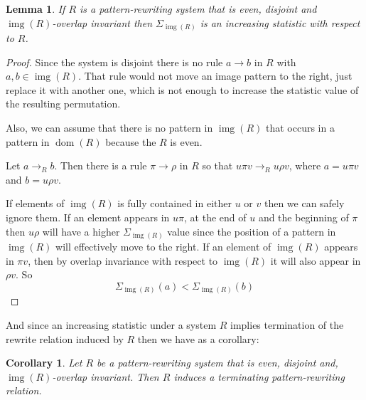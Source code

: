 \documentclass[a4paper, 11pt, english]{article}
\newcommand{\patternrule}{ \to \!}
\newtheorem{lemma}[theorem]{Lemma}
\newtheorem{corollary}[theorem]{Corollary}
\theoremstyle{definition}
\DeclareMathOperator{\dom}{dom}
\DeclareMathOperator{\img}{img}
\begin{document}
\begin{lemma}
  If $R$ is a pattern-rewriting system that is even, disjoint and $\img(R)$-overlap invariant 
  then $\Sigma_{\img(R)}$ is an increasing statistic with respect to $R$. 
\end{lemma}
\begin{proof}
  Since the system is disjoint there is no rule $a \patternrule b$ in $R$ with $a, b \in \img(R)$.
  That rule would not move an image pattern to the right, just replace it with another one, which is
  not enough to increase the statistic value of the resulting permutation.

  Also, we can assume that there is no pattern in $\img(R)$ that occurs in a pattern in $\dom(R)$
  because the $R$ is even.

  Let $a \to_R b$. Then there is a rule $\pi \patternrule \rho$ in
  $R$ so that $u \pi v \to_R u \rho v$, where $a = u \pi v$ and $b =
  u \rho v$. 

  If elements of $\img(R)$ is fully contained in either $u$ or $v$ then we
  can safely ignore them. If an element appears in $u\pi$, at the end of $u$ and the beginning of
  $\pi$ then $u \rho$ will have a higher $\Sigma_{\img(R)}$ value since the position of a pattern in $\img(R)$ will
  effectively move to the right. If an element of $\img(R)$ appears in $\pi v$,
  then by overlap invariance with respect to $\img(R)$ it will also appear in $\rho v$.
  So
  \[
      \Sigma_{\img(R)}(a) < \Sigma_{\img(R)}(b)
  \]

\end{proof}

And since an increasing statistic under a system $R$ implies termination of the rewrite relation
induced by $R$ then we have as a corollary:

\begin{corollary}
    Let $R$ be a pattern-rewriting system that is even, disjoint and, $\img(R)$-overlap invariant. 
    Then $R$ induces a terminating pattern-rewriting relation.
\end{corollary}
\end{document}
